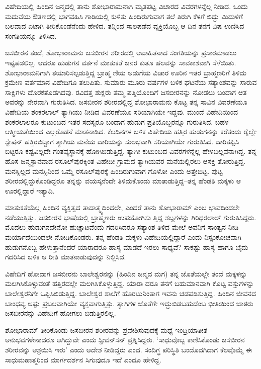 ವಿಹೇದಿಯಲ್ಲಿ ಹಿಂದಿನ ಜನ್ಮದಲ್ಲಿ ತಾನು ಶೋಭಾರಾಮನಾಗಿ ಮೃತಪಟ್ಟ ವಿಚಾರದ ವಿವರಗಳನ್ನೆಲ್ಲ ನೀಡಿದ. ಒಂದು ಮದುವೆಯ ಔತಣದಲ್ಲಿ ಭಾಗವಹಿಸಿ ಗಾಡಿಯಲ್ಲಿ ಕುಳಿತು ಹಿಂದಿರುಗುವಾಗ ತಲೆ ತಿರುಗಿ ಕೆಳಗೆ ಬಿದ್ದು ಮಿದುಳಿಗೆ ಬಲವಾದ ಏಟಾಗಿ ತೀರಿಕೊಂಡೆನೆಂದು ಹೇಳಿದ. ತನ್ನಿಂದ ಸಾಲಪಡೆದ ವ್ಯಕ್ತಿಯೊಬ್ಬ ಆ ದಿನ ತನಗೆ ವಿಷ ಉಣಿಸಿದ ಸಂಗತಿಯನ್ನೂ ತಿಳಿಸಿದ.

ಜಸಬೀರನ ತಂದೆ, ಶೋಭಾರಾಮನು ಜಸಬೀರನ ಶರೀರದಲ್ಲಿ ಆವಾಹಿತನಾದ ಸಂಗತಿಯನ್ನು ಪ್ರಸಾರಮಾಡಲು ಇಷ್ಟಪಡಲಿಲ್ಲ. ಆದರೂ ಹುಡುಗನ ವರ್ತನೆ ಮಾತುಕತೆ ಜನರ ಕುತೂ ಹಲವನ್ನು ಸಾವಕಾಶವಾಗಿ ಸೆಳೆಯಿತು. ಶೋಭಾರಾಮನಿಗಾಗಿ ತಯಾರಿಸಲ್ಪಡುತ್ತಿದ್ದ ಬ್ರಾಹ್ಮ ಣಿಯ ಅಡುಗೆಯ ವಿಚಾರ ಊರಿನ ಇತರ ಬ್ರಾಹ್ಮಣರಿಗೆ ತಿಳಿದು ಕ್ರಮೇಣ ವರ್ತಮಾನ ವಿಹೇದಿಗೂ ತಲುಪಿತು. ಸುಮಾರು ಮೂರು ವರ್ಷಗಳ ಬಳಿಕ ಘಟನೆಯ ಸತ್ಯಾಂಶವನ್ನು ಸಾರುವ ಸಾಕ್ಷಿಗಳು ದೊರಕತೊಡಗಿದವು. ರವಿದತ್ತ ಶುಕ್ಲರು ತಮ್ಮ ಪತ್ನಿಯೊಂದಿಗೆ ಜಸಬೀರನನ್ನು ನೋಡಲು ಬಂದಾಗ ಆತ ಅವರನ್ನು ನೇರವಾಗಿ ಗುರುತಿಸಿದ. ಜಸಬೀರನ ಶರೀರದಲ್ಲಿದ್ದ ಶೋಭಾರಾಮನು ಕೊಟ್ಟ ತನ್ನ ಸಾವಿನ ವಿವರಣೆಯೂ ವಿಹೇದಿಯ ಶಂಕರಲಾಲ್ ತ್ಯಾಗಿಯು ನೀಡಿದ ವಿವರಣೆಯೂ ಸರಿಯಾಗಿಯೇ ಇದ್ದವು. ಮುಂದೆ ವಿಹೇದಿಯಿಂದ ಶಂಕರಲಾಲರೂ ಕುಟುಂಬದ ಇತರ ಸದಸ್ಯರೂ ಬಂದಾಗ ಹುಡುಗ ಪ್ರತಿಯೊಬ್ಬರನ್ನೂ ಗುರುತಿಸಿದ. ಬಹಳ ಆತ್ಮೀಯತೆಯಿಂದ ಎಲ್ಲರೊಡನೆ ಮಾತನಾಡಿದ. ಕೆಲದಿನಗಳ ಬಳಿಕ ವಿಹೇದಿಯ ಹತ್ತಿರ ಹುಡುಗನನ್ನು ಕರೆತಂದು ರೈಲ್ವೇ ಸ್ಟೇಷನ್ ಹತ್ತಿರಬಿಟ್ಟಾಗ ತ್ಯಾಗಿಯ ಮನೆಯ ದಾರಿಯನ್ನು ಸುಲಭವಾಗಿ ಸರಿಯಾಗಿಯೇ ಗುರುತಿಸಿದ. ದಾರಿತಪ್ಪಿಸಿ ಬಿಟ್ಟರೂ ಕಷ್ಟವಿಲ್ಲದೇ ಗಂತವ್ಯಸ್ಥಾನಕ್ಕೆ ಹೋಗಿಬಿಡುತ್ತಿದ್ದ. ತ್ಯಾಗೀ ಕುಟುಂಬದ ವಿವರಗಳನ್ನೆಲ್ಲ ಹೇಳಬಲ್ಲವನಾಗಿದ್ದ. ತನ್ನ ಹೊಸ ಜನ್ಮಸ್ಥಾನವಾದ ರಸೂಲ್​ಪುರಕ್ಕಿಂತ ವಿಹೇದೀ ಗ್ರಾಮದ ತ್ಯಾಗಿಯವರ ಮನೆಯಲ್ಲಿರಲು ಆಸಕ್ತಿ ತೋರುತ್ತಿದ್ದ. ಮನಸ್ಸಿಲ್ಲದ ಮನಸ್ಸಿನಿಂದ ಒಮ್ಮೆ ರಸೂಲ್​ಪುರಕ್ಕೆ ಹಿಂದಿರುಗುವಾಗ ಗೊಳೋ ಎಂದು ಅತ್ತೇಬಿಟ್ಟ. ಪುಟ್ಟ ಶರೀರದಲ್ಲಿದ್ದುಕೊಂಡಿದ್ದರೂ ತನ್ನನ್ನು ವಯಸ್ಕನೆಂದೇ ತಿಳಿದುಕೊಂಡು ಮಾತಾಡುತ್ತಿದ್ದ–ತನ್ನ ಹೆಂಡತಿ ಮಕ್ಕಳು ಆ ಊರಲ್ಲಿದ್ದಾರೆ ಇತ್ಯಾದಿ.

ಮಾತುಕತೆಯೆಲ್ಲ ಹಿಂದಿನ ವ್ಯಕ್ತಿತ್ವದ ತಾದಾತ್ಮ್ಯದಿಂದಲೇ, ಎಂದರೆ ತಾನು ಶೋಭಾರಾಮ್ ಎಂಬ ಭಾವದಿಂದಲೇ ನಡೆಯುತ್ತಿತ್ತು. ಜಸಬೀರನ ಭಾಷೆಯಲ್ಲಿ ಬ್ರಾಹ್ಮಣರು ಉಪಯೋಗಿಸು ತ್ತಿದ್ದ ಶಬ್ದಗಳನ್ನು ಗಿರಿಧರಲಾಲ್ ಗುರುತಿಸಿದ್ದರು. ಮೊದಲು ಹುಡುಗನದೇನೋ ಹುಚ್ಚಾಟವೆಂದು ಗದರಿಸಿದರೂ ಸತ್ಯಾಂಶ ತಿಳಿದ ಮೇಲೆ ಅವನಿಗೆ ಸಾಂತ್ವನ ನೀಡಿ ಮರ್ಯಾದೆಯಿಂದಲೇ ನೋಡಿಕೊಂಡರು. ತನ್ನ ಹೆಂಡತಿ ಮಕ್ಕಳು ವಿಹೇದಿಯಲ್ಲಿದ್ದಾರೆ ಎಂದು ನಿಸ್ಸಂಕೋಚವಾಗಿ ಹುಡುಗನೊಬ್ಬ ಹೇಳುತ್ತಾನೆಂದರೆ ಯಾರಾದರೂ ಹಾಸ್ಯ ಮಾಡದೆ ಇರಲು ಸಾಧ್ಯವೆ? ಸಾಕಷ್ಟು ಹಾಸ್ಯ ಹಾಗೂ ಬೈದು ಗದರಿಸಿದ ಬಳಿಕ ಆ ರೀತಿ ಮಾತನಾಡುವುದನ್ನು ನಿಲ್ಲಿಸಿದ.

ವಿಹೇದಿಗೆ ಹೋದಾಗ ಜಸಬೀರನು ಬಾಲೇಶ್ವರನನ್ನು (ಹಿಂದಿನ ಜನ್ಮದ ಮಗ) ತನ್ನ ಜೊತೆಯಲ್ಲೇ ತಂದೆ ಮಕ್ಕಳನ್ನು ಮಲಗಿಸಿಕೊಳ್ಳುವಂತೆ ಹತ್ತಿರದಲ್ಲೇ ಮಲಗಿಸಿಕೊಳ್ಳುತ್ತಿದ್ದ. ಯಾರಾ ದರೂ ತನಗೆ ಬಹುಮಾನವಾಗಿ ಕೊಟ್ಟ ವಸ್ತುಗಳನ್ನು ಬಾಲೇಶ್ವರನಿಗೇ ಒಪ್ಪಿಸಿಬಿಡುತ್ತಿದ್ದ. ಬಾಲೇಶ್ವರ ಶಾಲೆಗೆ ಹೊರಟುನಿಂತಾಗ ಇವನು ಚಡಪಡಿಸುತ್ತಿದ್ದ. ಹಿಂದಿನ ಜೀವನದ ಬಾಂಧವ್ಯ ಅಷ್ಟು ಪ್ರಬಲವಾಗಿಯೇ ವ್ಯಕ್ತವಾಗುತ್ತಿತ್ತು. ತ್ಯಾಗಿಗಳ ಜೊತೆಗೇ ಇದ್ದುಬಿಡಬಹುದೆಂಬ ಭೀತಿಯಿಂದ ಜಾಠರು ಜಸಬೀರನನ್ನು ವಿಹೇದಿಗೆ ಹೋಗಲು ಬಿಡುತ್ತಿರಲಿಲ್ಲ.

ಶೋಭಾರಾಮ್ ತೀರಿಕೊಂಡು ಜಸಬೀರನ ಶರೀರವನ್ನು ಪ್ರವೇಶಿಸುವುದಕ್ಕೆ ಮಧ್ಯೆ ಇಂದ್ರಿಯಾತೀತ ಅನುಭವಗಳೇನಾದರೂ ಆಗಿದ್ದುವೇ ಎಂದು ಸ್ಟೀವನ್​ಸನ್ ಪ್ರಶ್ನಿಸಿದ್ದರು. ‘ಸಾಧುವೊಬ್ಬ ಕಾಣಿಸಿಕೊಂಡು ಜಸಬೀರನ ಶರೀರವನ್ನು ಆಶ್ರಯಿಸಿ ಇರು’ ಎಂದು ಆದೇಶ ನೀಡಿದ್ದರು ಎಂದ. ಸಂದಿಗ್ಧ ಪರಿಸ್ಥಿತಿ ಬಂದೊದಗಿದಾಗ ಕೆಲವೊಮ್ಮೆ ಈ ಸಾಧುಮಹಾತ್ಮರಿಂದ ಮಾರ್ಗದರ್ಶನ ಸಿಗುವುದೂ ಇದೆ ಎಂದೂ ಹೇಳಿದ್ದ.

